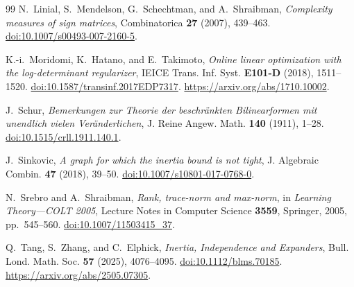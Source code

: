 \documentclass[11pt]{article}
\numberwithin{equation}{section}
\theoremstyle{definition}
\theoremstyle{remark}
\begin{document}
\begin{thebibliography}{99}
N.~Linial, S.~Mendelson, G.~Schechtman, and A.~Shraibman,
\emph{Complexity measures of sign matrices},
Combinatorica \textbf{27} (2007), 439--463.
\href{https://doi.org/10.1007/s00493-007-2160-5}
{doi:10.1007/s00493-007-2160-5}.

K.-i.~Moridomi, K.~Hatano, and E.~Takimoto,
\emph{Online linear optimization with the log-determinant regularizer},
IEICE Trans. Inf. Syst. \textbf{E101-D} (2018), 1511--1520.
\href{https://doi.org/10.1587/transinf.2017EDP7317}
{doi:10.1587/transinf.2017EDP7317}.
\url{https://arxiv.org/abs/1710.10002}.

J.~Schur,
\emph{Bemerkungen zur Theorie der beschr\"ankten Bilinearformen
mit unendlich vielen Ver\"anderlichen},
J. Reine Angew. Math. \textbf{140} (1911), 1--28.
\href{https://doi.org/10.1515/crll.1911.140.1}
{doi:10.1515/crll.1911.140.1}.

J.~Sinkovic,
\emph{A graph for which the inertia bound is not tight},
J. Algebraic Combin. \textbf{47} (2018), 39--50.
\href{https://doi.org/10.1007/s10801-017-0768-0}
{doi:10.1007/s10801-017-0768-0}.

N.~Srebro and A.~Shraibman,
\emph{Rank, trace-norm and max-norm},
in \emph{Learning Theory---COLT 2005},
Lecture Notes in Computer Science \textbf{3559},
Springer, 2005, pp.~545--560.
\href{https://doi.org/10.1007/11503415_37}
{doi:10.1007/11503415\_37}.

Q.~Tang, S.~Zhang, and C.~Elphick,
\emph{Inertia, Independence and Expanders},
Bull. Lond. Math. Soc. \textbf{57} (2025), 4076--4095.
\href{https://doi.org/10.1112/blms.70185}{doi:10.1112/blms.70185}.
\url{https://arxiv.org/abs/2505.07305}.
\end{thebibliography}
\end{document}
